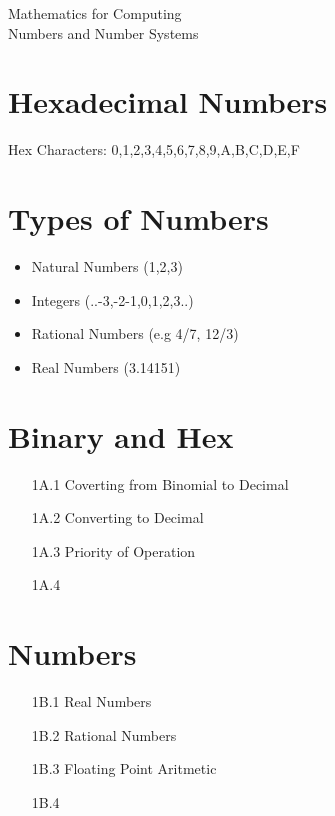 \documentclass[12pt]{article}
\begin{document}
\begin{center}
\huge{Mathematics for Computing}\\
\LARGE{Numbers and Number Systems}
\end{center}




\section{Hexadecimal Numbers}
\Large{
	Hex Characters: 0,1,2,3,4,5,6,7,8,9,A,B,C,D,E,F}


\section{Types of Numbers}
\Large{
	\begin{itemize}
		\item Natural Numbers (1,2,3)
		\item Integers (..-3,-2-1,0,1,2,3..)
		\item Rational Numbers (e.g 4/7, 12/3)
		\item Real Numbers (3.14151)
	\end{itemize}
}
\section*{Binary and Hex}
\begin{itemize}
	\item[1A.1] Coverting from Binomial to Decimal
	\item[1A.2] Converting to Decimal
	\item[1A.3] Priority of Operation
	\item[1A.4] 
\end{itemize}
\newpage
\section*{Numbers}
\begin{itemize}
	\item[1B.1] Real Numbers
	\item[1B.2] Rational Numbers
	\item[1B.3] Floating Point Aritmetic
	\item[1B.4] 
\end{itemize}
\end{document}
